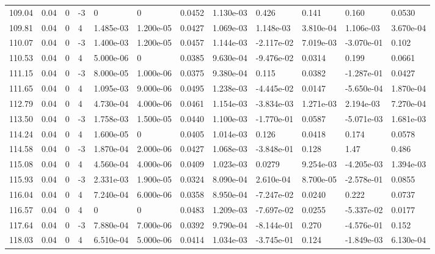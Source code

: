 \documentclass[preview]{standalone}
\begin{document}
{{{{{{{\begin{tabular}{L{1.2cm}C{1.2cm} C{0.3cm}C{0.5cm} C{1.4cm}C{1.4cm} C{1.4cm}C{1.4cm} C{1.6cm}C{1.6cm} C{1.6cm}C{1.6cm}}
  109.04  &  0.04  & 0     & -3 &  0  & 0  &  0.0452&   1.130e-03& 0.426 & 0.141   &  0.160 & 0.0530  \\ 
  109.81  &  0.04  & 0     &  4 &  1.485e-03  & 1.200e-05  &  0.0427&   1.069e-03& 1.148e-03 & 3.810e-04   &  1.106e-03 & 3.670e-04  \\ 
  110.07  &  0.04  & 0     & -3 &  1.400e-03  & 1.200e-05  &  0.0457&   1.144e-03& -2.117e-02 & 7.019e-03   &  -3.070e-01 & 0.102  \\ 
  110.53  &  0.04  & 0     &  4 &  5.000e-06  & 0  &  0.0385&   9.630e-04& -9.476e-02 & 0.0314   &  0.199 & 0.0661  \\ 
  111.15  &  0.04  & 0     & -3 &  8.000e-05  & 1.000e-06  &  0.0375&   9.380e-04& 0.115 & 0.0382   &  -1.287e-01 & 0.0427  \\ 
  111.65  &  0.04  & 0     &  4 &  1.095e-03  & 9.000e-06  &  0.0495&   1.238e-03& -4.445e-02 & 0.0147   &  -5.650e-04 & 1.870e-04  \\ 
  112.79  &  0.04  & 0     &  4 &  4.730e-04  & 4.000e-06  &  0.0461&   1.154e-03& -3.834e-03 & 1.271e-03   &  2.194e-03 & 7.270e-04  \\ 
  113.50  &  0.04  & 0     & -3 &  1.758e-03  & 1.500e-05  &  0.0440&   1.100e-03& -1.770e-01 & 0.0587   &  -5.071e-03 & 1.681e-03  \\ 
  114.24  &  0.04  & 0     &  4 &  1.600e-05  & 0  &  0.0405&   1.014e-03& 0.126 & 0.0418   &  0.174 & 0.0578  \\ 
  114.58  &  0.04  & 0     & -3 &  1.870e-04  & 2.000e-06  &  0.0427&   1.068e-03& -3.848e-01 & 0.128   &  1.47 & 0.486  \\ 
  115.08  &  0.04  & 0     &  4 &  4.560e-04  & 4.000e-06  &  0.0409&   1.023e-03& 0.0279 & 9.254e-03   &  -4.205e-03 & 1.394e-03  \\ 
  115.93  &  0.04  & 0     & -3 &  2.331e-03  & 1.900e-05  &  0.0324&   8.090e-04& 2.610e-04 & 8.700e-05   &  -2.578e-01 & 0.0855  \\ 
  116.04  &  0.04  & 0     &  4 &  7.240e-04  & 6.000e-06  &  0.0358&   8.950e-04& -7.247e-02 & 0.0240   &  0.222 & 0.0737  \\ 
  116.57  &  0.04  & 0     &  4 &  0  & 0  &  0.0483&   1.209e-03& -7.697e-02 & 0.0255   &  -5.337e-02 & 0.0177  \\ 
  117.64  &  0.04  & 0     & -3 &  7.880e-04  & 7.000e-06  &  0.0392&   9.790e-04& -8.144e-01 & 0.270   &  -4.576e-01 & 0.152  \\ 
  118.03  &  0.04  & 0     &  4 &  6.510e-04  & 5.000e-06  &  0.0414&   1.034e-03& -3.745e-01 & 0.124   &  -1.849e-03 & 6.130e-04  \\ 

\end{tabular}}}}}}}}
\end{document}
